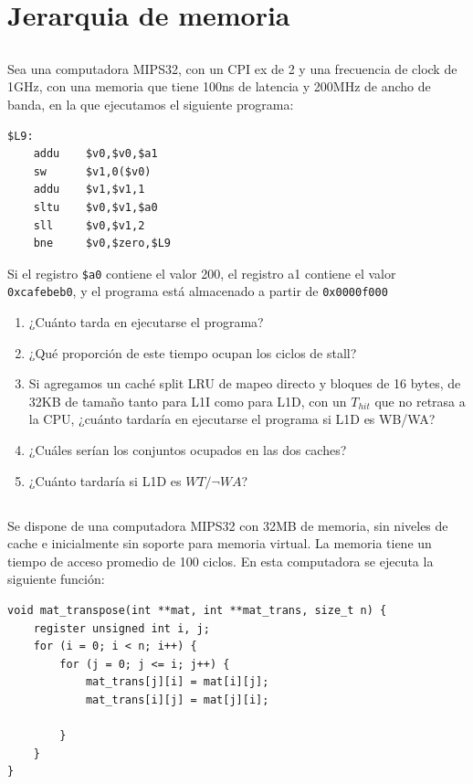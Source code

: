 \section{Jerarquia de memoria}

\subsection{}
Sea una computadora MIPS32, con un CPI ex de 2 y una frecuencia de clock de 1GHz, con una
memoria que tiene 100ns de latencia y 200MHz de ancho de banda, en la que ejecutamos el siguiente
programa:

\begin{verbatim}
$L9:
    addu    $v0,$v0,$a1
    sw      $v1,0($v0)
    addu    $v1,$v1,1
    sltu    $v0,$v1,$a0
    sll     $v0,$v1,2
    bne     $v0,$zero,$L9
\end{verbatim}

Si el registro \texttt{\$a0} contiene el valor 200, el registro a1 contiene el valor \texttt{0xcafebeb0}, y el programa está almacenado a partir de \texttt{0x0000f000}

\begin{enumerate}[label=\alph*)]
 \item ¿Cuánto tarda en ejecutarse el programa?
 \item ¿Qué proporción de este tiempo ocupan los ciclos de stall?
 \item Si agregamos un caché split LRU de mapeo directo y bloques de 16 bytes, de 32KB de tamaño
tanto para L1I como para L1D, con un $T_{hit}$ que no retrasa a la CPU, ¿cuánto tardaría en
ejecutarse el programa si L1D es WB/WA?
 \item ¿Cuáles serían los conjuntos ocupados en las dos caches?
 \item ¿Cuánto tardaría si L1D es $WT/¬WA$?
\end{enumerate}

\subsection{}
Se dispone de una computadora MIPS32 con 32MB de memoria, sin niveles de cache e inicialmente sin soporte para memoria virtual. La memoria tiene un tiempo de acceso promedio de 100 ciclos. En esta computadora se ejecuta la siguiente función:

\begin{verbatim}
void mat_transpose(int **mat, int **mat_trans, size_t n) {
    register unsigned int i, j;
    for (i = 0; i < n; i++) {
        for (j = 0; j <= i; j++) {
            mat_trans[j][i] = mat[i][j];
            mat_trans[i][j] = mat[j][i];

        }
    }
}
\end{verbatim}

